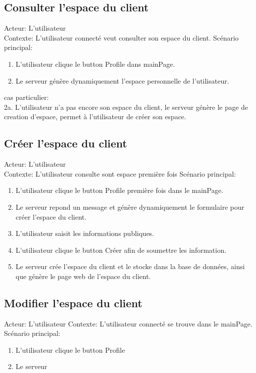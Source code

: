\documentclass[14px]{article}
\begin{document}
\subsection{Consulter l'espace du client}
Acteur: L'utilisateur\\
Contexte: L'utilisateur connecté veut consulter son espace du client.
Scénario principal:
\begin{enumerate}
	\item L'utilisateur clique le button Profile dans mainPage.
	\item Le serveur génère dynamiquement l'espace personnelle de l'utilisateur.
\end{enumerate}
cas particulier:\\
2a. L'utilisateur n'a pas encore son espace du client, le serveur génère le page de creation d'espace, permet à l'utilisateur de créer son espace.


\subsection{Créer l'espace du client}
Acteur: L'utilisateur\\
Contexte: L'utilisateur consulte sont espace première fois
Scénario principal:
\begin{enumerate}
	\item L'utilisateur clique le button Profile première fois dans le mainPage.
	\item Le serveur repond un message et génère dynamiquement le formulaire pour créer l'espace du client.
	\item L'utilisateur saisit les informations publiques.
	\item L'utilisateur clique le button Créer afin de soumettre les information.
	\item Le serveur crée l'espace du client et le stocke dans la base de données, ainsi que génère le page web de l'espace du client.
\end{enumerate}

\subsection{Modifier l'espace du client}
Acteur: L'utilisateur
Contexte: L'utilisateur connecté se trouve dans le mainPage.
Scénario principal:
\begin{enumerate}
	\item L'utilisateur clique le button Profile
	\item Le serveur
\end{enumerate}
\end{document}
